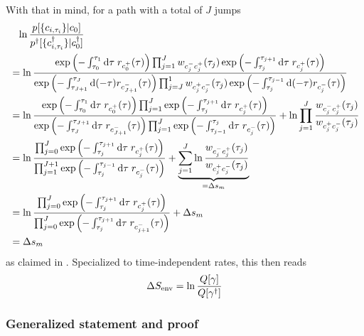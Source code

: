With that in mind, for a path with a total of \(J\) jumps
%
\begin{align*}
	&\phantom{=}
		\ln\frac{p[\{c_{i,\tau_i}\} | c_0]}{p^\dagger[\{c^\dagger_{i,\tau_i}\} | c_0^\dagger]}
	\\
	&=
		\ln\frac{
			\operatorname{exp}\left(-\int_{\tau_0}^{\tau_1}\mathrm{d}\tau\;r_{c_0^+}(\tau)\right)
			\prod_{j=1}^J
				w_{c_j^-c_j^+}(\tau_j)
				\operatorname{exp}\left(-\int_{\tau_j}^{\tau_{j+1}}\mathrm{d}\tau\;r_{c_j^+}(\tau)\right)
		}{
			\operatorname{exp}\left(-\int_{\tau_{J+1}}^{\tau_J}\mathrm{d}(-\tau)r_{c_{J+1}^-}(\tau)\right)
			\prod_{j=J}^1
				w_{c_j^+c_j^-}(\tau_j)
				\operatorname{exp}\left(-\int_{\tau_j}^{\tau_{j-1}}\mathrm{d}(-\tau)r_{c_j^-}(\tau)\right)
		}
	\\
	&=
		\ln\frac{
			\operatorname{exp}\left(-\int_{\tau_0}^{\tau_1}\mathrm{d}\tau\;r_{c_0^+}(\tau)\right)
			\prod_{j=1}^J
				\operatorname{exp}\left(-\int_{\tau_j}^{\tau_{j+1}}\mathrm{d}\tau\;r_{c_j^+}(\tau)\right)
		}{
			\operatorname{exp}\left(-\int_{\tau_J}^{\tau_{J+1}}\mathrm{d}\tau\;r_{c_{J+1}^-}(\tau)\right)
			\prod_{j=1}^J
				\operatorname{exp}\left(-\int_{\tau_{j-1}}^{\tau_j}\mathrm{d}\tau\;r_{c_j^-}(\tau)\right)
		} + \ln\prod_{j=1}^J\frac{w_{c_j^-c_j^+}(\tau_j)}{w_{c_j^+c_j^-}(\tau_j)}
	\\
	&=
		\ln\frac{
			\prod_{j=0}^J
				\operatorname{exp}\left(-\int_{\tau_j}^{\tau_{j+1}}\mathrm{d}\tau\;r_{c_j^+}(\tau)\right)
		}{
			\prod_{j=1}^{J+1}
				\operatorname{exp}\left(-\int_{\tau_j}^{\tau_{j-1}}\mathrm{d}\tau\;r_{c_j^-}(\tau)\right)
		}
		+ \underbrace{\sum_{j=1}^J\ln\frac{w_{c_j^-c_j^+}(\tau_j)}{w_{c_j^+c_j^-}(\tau_j)}}_{=\Delta s_m}
	\\
	&=
		\ln\frac{
			\prod_{j=0}^J
				\operatorname{exp}\left(-\int_{\tau_j}^{\tau_{j+1}}\mathrm{d}\tau\;r_{c_j^+}(\tau)\right)
		}{
			\prod_{j=0}^J
				\operatorname{exp}\left(-\int_{\tau_j}^{\tau_{j+1}}\mathrm{d}\tau\;r_{c_{j+1}^-}(\tau)\right)
		}
		+ \Delta s_m
	\\
	&=
		\Delta s_m
\end{align*}
%
as claimed in . Specialized to time-independent rates, this then reads
\begin{align}
	\label{eqn:SEnv path functional constant rates}
	\Delta S_\text{env}
	= \ln\frac{Q[\gamma]}{Q[\gamma^\dagger]}
\end{align}



\subsubsection{Generalized statement and proof}

